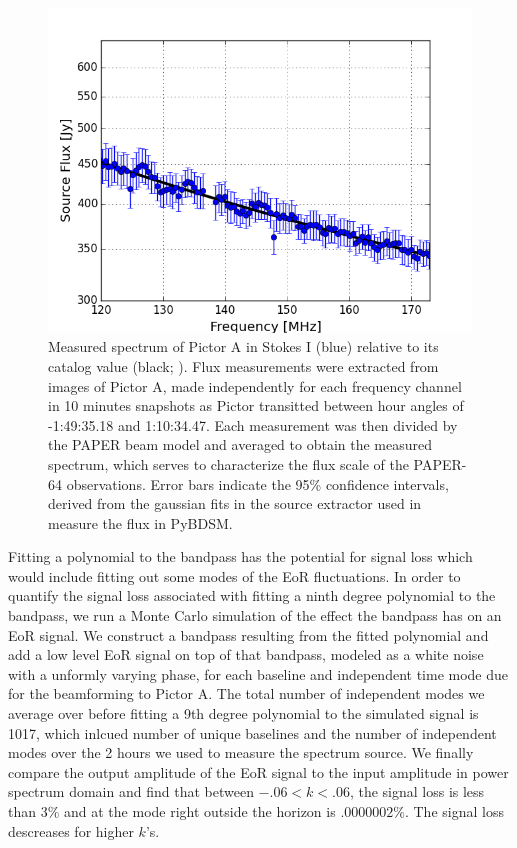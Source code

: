 \documentclass[twocolumn,numberedappendix]{emulateapj} \shorttitle{PSA64}
\begin{document}
\begin{figure}[!t]
\centering
\includegraphics[width=\columnwidth]{plots/picspec.png}
\caption{
Measured spectrum of Pictor A in Stokes I (blue) relative to its catalog
value (black; \citealt{jacobs_et_al2013}).  Flux measurements were
extracted from images of Pictor A, made independently for each frequency channel in
10 minutes snapshots as Pictor transitted between hour angles of -1:49:35.18
and 1:10:34.47.  Each measurement was then divided by the PAPER beam model and
averaged to obtain the measured spectrum, which serves to characterize the flux
scale of the PAPER-64 observations. Error bars indicate the 95\% confidence
intervals, derived from the gaussian fits in the source extractor used in
measure the flux in PyBDSM.
}\label{fig:pic_spec}
\end{figure}

Fitting a polynomial to the bandpass has the potential for signal loss which
would include fitting out some modes of the EoR fluctuations. In order to
quantify the signal loss associated with fitting a ninth degree polynomial to
the bandpass, we run a Monte Carlo simulation of the effect the bandpass has on
an EoR signal. We construct a bandpass resulting from the fitted
polynomial and add a low level EoR signal on top of that bandpass, modeled as a
white noise with a unformly varying phase, for each baseline and independent
time mode due for the beamforming to Pictor A. The total number of independent
modes we average over before fitting a 9th degree polynomial to the simulated
signal is 1017, which inlcued number of unique baselines and the number of
independent modes over the 2 hours we used to measure the spectrum source. We
finally compare the output amplitude of the EoR signal to the input amplitude in
power spectrum domain and find that between $-.06 < k < .06$, the signal loss is
less than $3\%$ and at the mode right outside the horizon is $.0000002\%$. The
signal loss descreases for higher $k$'s.
\end{document}
